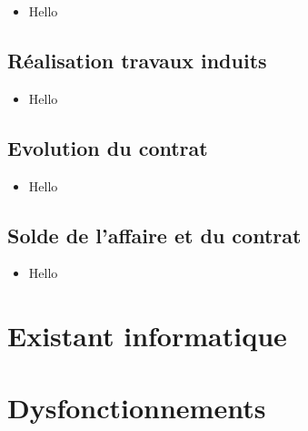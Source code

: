 \begin{itemize}
    \item Hello
\end{itemize}

\subsection{R\'ealisation travaux induits}

\begin{itemize}
    \item Hello
\end{itemize}

\subsection{Evolution du contrat}

\begin{itemize}
    \item Hello
\end{itemize}

\subsection{Solde de l'affaire et du contrat}

\begin{itemize}
    \item Hello
\end{itemize}

\section{Existant informatique}

\section{Dysfonctionnements}

